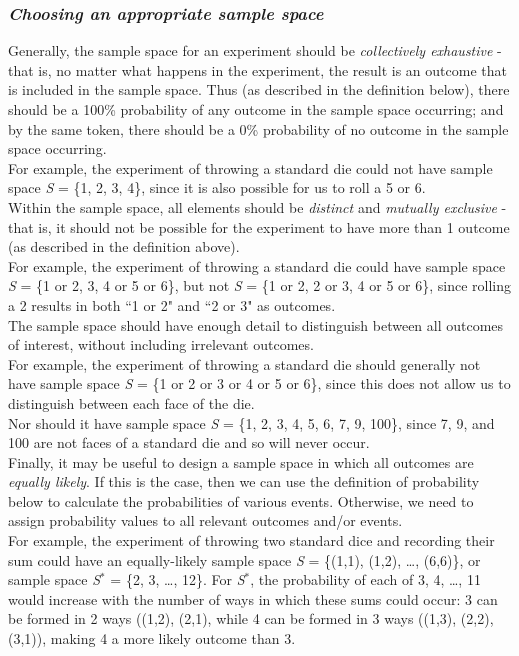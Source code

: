 \documentclass{article}
\begin{document}
\subsubsection*{\em Choosing an appropriate sample space}
Generally, the sample space for an experiment should be \textit{collectively exhaustive} - that is, no matter what happens in the experiment, the result is an outcome that is included in the sample space. Thus (as described in the definition below), there should be a 100\% probability of any outcome in the sample space occurring; and by the same token, there should be a 0\% probability of no outcome in the sample space occurring.\\[1ex]
For example, the experiment of throwing a standard die could not have sample space \textsl{S} = \{1, 2, 3, 4\}, since it is also possible for us to roll a 5 or 6.\\[1em]
Within the sample space, all elements should be \textit{distinct} and \textit{mutually exclusive} - that is, it should not be possible for the experiment to have more than 1 outcome (as described in the definition above).\\[1ex]
For example, the experiment of throwing a standard die could have sample space \textsl{S} = \{1 or 2, 3, 4 or 5 or 6\}, but not \textsl{S} = \{1 or 2, 2 or 3, 4 or 5 or 6\}, since rolling a 2 results in both ``1 or 2" and ``2 or 3" as outcomes.\\[1em]
The sample space should have enough detail to distinguish between all outcomes of interest, without including irrelevant outcomes.\\[1ex]
For example, the experiment of throwing a standard die should generally not have sample space \textsl{S} = \{1 or 2 or 3 or 4 or 5 or 6\}, since this does not allow us to distinguish between each face of the die.\\
Nor should it have sample space \textsl{S} = \{1, 2, 3, 4, 5, 6, 7, 9, 100\}, since 7, 9, and 100 are not faces of a standard die and so will never occur.\\[1em]
Finally, it may be useful to design a sample space in which all outcomes are \textit{equally likely}. If this is the case, then we can use the definition of probability below to calculate the probabilities of various events. Otherwise, we need to assign probability values to all relevant outcomes and/or events.\\[1ex]
For example, the experiment of throwing two standard dice and recording their sum could have an equally-likely sample space \textsl{S} = \{(1,1), (1,2), \ldots, (6,6)\}, or sample space \textsl{S}$^*$ = \{2, 3, \ldots, 12\}. For \textsl{S}$^*$, the probability of each of 3, 4, \ldots, 11 would increase with the number of ways in which these sums could occur: 3 can be formed in 2 ways ((1,2), (2,1), while 4 can be formed in 3 ways ((1,3), (2,2), (3,1)), making 4 a more likely outcome than 3.
\end{document}

